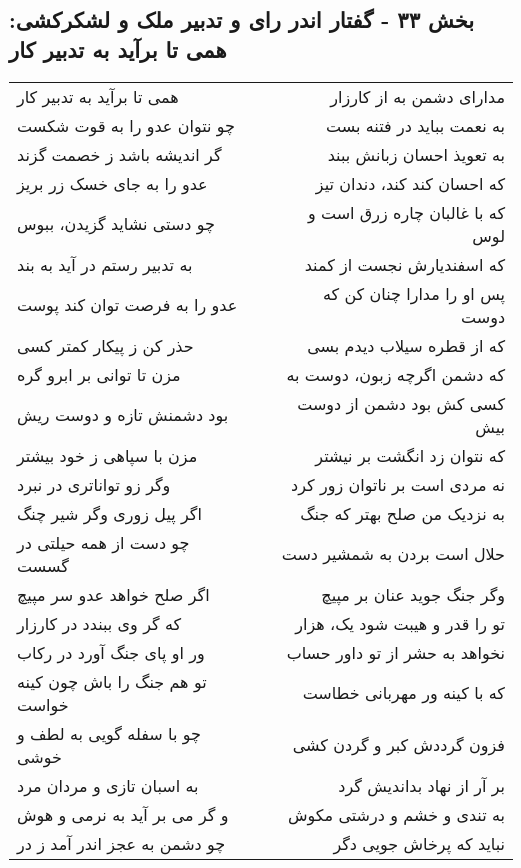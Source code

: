 \begin{center}
\section*{بخش ۳۳ - گفتار اندر رای و تدبیر ملک و لشکرکشی: همی تا برآید به تدبیر کار}
\label{sec:033}
\begin{longtable}{l p{0.5cm} r}
همی تا برآید به تدبیر کار
&&
مدارای دشمن به از کارزار
\\
چو نتوان عدو را به قوت شکست
&&
به نعمت بباید در فتنه بست
\\
گر اندیشه باشد ز خصمت گزند
&&
به تعویذ احسان زبانش ببند
\\
عدو را به جای خسک زر بریز
&&
که احسان کند کند، دندان تیز
\\
چو دستی نشاید گزیدن، ببوس
&&
که با غالبان چاره زرق است و لوس
\\
به تدبیر رستم در آید به بند
&&
که اسفندیارش نجست از کمند
\\
عدو را به فرصت توان کند پوست
&&
پس او را مدارا چنان کن که دوست
\\
حذر کن ز پیکار کمتر کسی
&&
که از قطره سیلاب دیدم بسی
\\
مزن تا توانی بر ابرو گره
&&
که دشمن اگرچه زبون، دوست به
\\
بود دشمنش تازه و دوست ریش
&&
کسی کش بود دشمن از دوست بیش
\\
مزن با سپاهی ز خود بیشتر
&&
که نتوان زد انگشت بر نیشتر
\\
وگر زو تواناتری در نبرد
&&
نه مردی است بر ناتوان زور کرد
\\
اگر پیل زوری وگر شیر چنگ
&&
به نزدیک من صلح بهتر که جنگ
\\
چو دست از همه حیلتی در گسست
&&
حلال است بردن به شمشیر دست
\\
اگر صلح خواهد عدو سر مپیچ
&&
وگر جنگ جوید عنان بر مپیچ
\\
که گر وی ببندد در کارزار
&&
تو را قدر و هیبت شود یک، هزار
\\
ور او پای جنگ آورد در رکاب
&&
نخواهد به حشر از تو داور حساب
\\
تو هم جنگ را باش چون کینه خواست
&&
که با کینه ور مهربانی خطاست
\\
چو با سفله گویی به لطف و خوشی
&&
فزون گرددش کبر و گردن کشی
\\
به اسبان تازی و مردان مرد
&&
بر آر از نهاد بداندیش گرد
\\
و گر می بر آید به نرمی و هوش
&&
به تندی و خشم و درشتی مکوش
\\
چو دشمن به عجز اندر آمد ز در
&&
نباید که پرخاش جویی دگر

\end{longtable}
\end{center}
